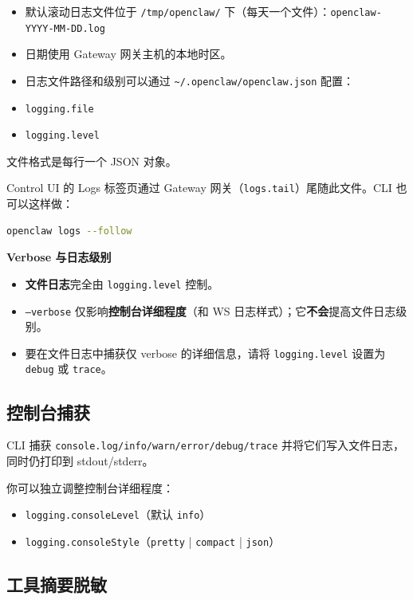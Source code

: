 \begin{itemize}
  \item 默认滚动日志文件位于 \texttt{/tmp/openclaw/} 下（每天一个文件）：\texttt{openclaw-YYYY-MM-DD.log}
  \item 日期使用 Gateway 网关主机的本地时区。
  \item 日志文件路径和级别可以通过 \texttt{\textasciitilde{}/.openclaw/openclaw.json} 配置：
  \item \texttt{logging.file}
  \item \texttt{logging.level}
\end{itemize}


文件格式是每行一个 JSON 对象。

Control UI 的 Logs 标签页通过 Gateway 网关（\texttt{logs.tail}）尾随此文件。CLI 也可以这样做：

\begin{lstlisting}[language=bash]
openclaw logs --follow
\end{lstlisting}


\textbf{Verbose 与日志级别}

\begin{itemize}
  \item \textbf{文件日志}完全由 \texttt{logging.level} 控制。
  \item \texttt{--verbose} 仅影响\textbf{控制台详细程度}（和 WS 日志样式）；它\textbf{不会}提高文件日志级别。
  \item 要在文件日志中捕获仅 verbose 的详细信息，请将 \texttt{logging.level} 设置为 \texttt{debug} 或 \texttt{trace}。
\end{itemize}


\subsection{控制台捕获}


CLI 捕获 \texttt{console.log/info/warn/error/debug/trace} 并将它们写入文件日志，同时仍打印到 stdout/stderr。

你可以独立调整控制台详细程度：

\begin{itemize}
  \item \texttt{logging.consoleLevel}（默认 \texttt{info}）
  \item \texttt{logging.consoleStyle}（\texttt{pretty} | \texttt{compact} | \texttt{json}）
\end{itemize}


\subsection{工具摘要脱敏}


